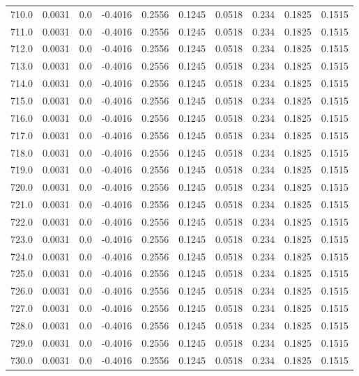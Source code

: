 \begin{longtable}{lrrrrrrrrr}
710.0 & 0.0031 & 0.0 & -0.4016 & 0.2556 & 0.1245 & 0.0518 & 0.234 & 0.1825 & 0.1515 \\
711.0 & 0.0031 & 0.0 & -0.4016 & 0.2556 & 0.1245 & 0.0518 & 0.234 & 0.1825 & 0.1515 \\
712.0 & 0.0031 & 0.0 & -0.4016 & 0.2556 & 0.1245 & 0.0518 & 0.234 & 0.1825 & 0.1515 \\
713.0 & 0.0031 & 0.0 & -0.4016 & 0.2556 & 0.1245 & 0.0518 & 0.234 & 0.1825 & 0.1515 \\
714.0 & 0.0031 & 0.0 & -0.4016 & 0.2556 & 0.1245 & 0.0518 & 0.234 & 0.1825 & 0.1515 \\
715.0 & 0.0031 & 0.0 & -0.4016 & 0.2556 & 0.1245 & 0.0518 & 0.234 & 0.1825 & 0.1515 \\
716.0 & 0.0031 & 0.0 & -0.4016 & 0.2556 & 0.1245 & 0.0518 & 0.234 & 0.1825 & 0.1515 \\
717.0 & 0.0031 & 0.0 & -0.4016 & 0.2556 & 0.1245 & 0.0518 & 0.234 & 0.1825 & 0.1515 \\
718.0 & 0.0031 & 0.0 & -0.4016 & 0.2556 & 0.1245 & 0.0518 & 0.234 & 0.1825 & 0.1515 \\
719.0 & 0.0031 & 0.0 & -0.4016 & 0.2556 & 0.1245 & 0.0518 & 0.234 & 0.1825 & 0.1515 \\
720.0 & 0.0031 & 0.0 & -0.4016 & 0.2556 & 0.1245 & 0.0518 & 0.234 & 0.1825 & 0.1515 \\
721.0 & 0.0031 & 0.0 & -0.4016 & 0.2556 & 0.1245 & 0.0518 & 0.234 & 0.1825 & 0.1515 \\
722.0 & 0.0031 & 0.0 & -0.4016 & 0.2556 & 0.1245 & 0.0518 & 0.234 & 0.1825 & 0.1515 \\
723.0 & 0.0031 & 0.0 & -0.4016 & 0.2556 & 0.1245 & 0.0518 & 0.234 & 0.1825 & 0.1515 \\
724.0 & 0.0031 & 0.0 & -0.4016 & 0.2556 & 0.1245 & 0.0518 & 0.234 & 0.1825 & 0.1515 \\
725.0 & 0.0031 & 0.0 & -0.4016 & 0.2556 & 0.1245 & 0.0518 & 0.234 & 0.1825 & 0.1515 \\
726.0 & 0.0031 & 0.0 & -0.4016 & 0.2556 & 0.1245 & 0.0518 & 0.234 & 0.1825 & 0.1515 \\
727.0 & 0.0031 & 0.0 & -0.4016 & 0.2556 & 0.1245 & 0.0518 & 0.234 & 0.1825 & 0.1515 \\
728.0 & 0.0031 & 0.0 & -0.4016 & 0.2556 & 0.1245 & 0.0518 & 0.234 & 0.1825 & 0.1515 \\
729.0 & 0.0031 & 0.0 & -0.4016 & 0.2556 & 0.1245 & 0.0518 & 0.234 & 0.1825 & 0.1515 \\
730.0 & 0.0031 & 0.0 & -0.4016 & 0.2556 & 0.1245 & 0.0518 & 0.234 & 0.1825 & 0.1515 \\

\end{longtable}
